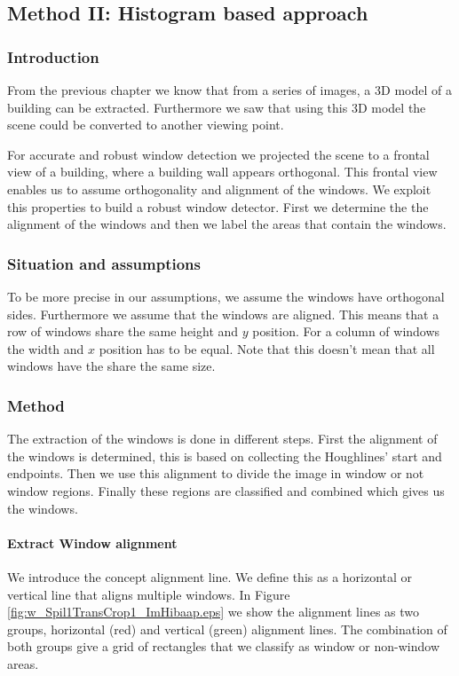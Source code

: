 

\subsection{Method II: Histogram based approach} 
\subsubsection{Introduction}
From the previous chapter we know that from a series of images, a 3D model of a
building can be extracted. Furthermore we saw that using this 3D model the
scene could be converted to another viewing point. 

For accurate and robust window detection we projected the scene to a frontal
view of a building, where a building wall appears orthogonal. This frontal
view enables us to assume orthogonality and alignment of the windows. We
exploit this properties to build a robust window detector.
First we determine the the alignment of the windows and
then we label the areas that contain the windows. 


\subsubsection{Situation and assumptions}
To be more precise in our assumptions, we assume the windows have orthogonal sides.  Furthermore we
assume that the windows are aligned. This means that a row of windows share the
same height and $y$ position. For a column of windows the width and $x$
position has to be equal.  Note that this doesn't mean that all windows have the
share the same size.

\subsubsection{Method}
The extraction of the windows is done in different steps. 
First the alignment of the windows is determined, this is based on collecting
the Houghlines' start and endpoints. Then we use this alignment to divide the
image in window or not window regions.  Finally these regions are classified
and combined which gives us the windows.


\paragraph{Extract Window alignment}
We introduce the concept alignment line. We define this as a horizontal or
vertical line that aligns multiple windows. In Figure
\ref{fig:w_Spil1TransCrop1_ImHibaap.eps}
we show the alignment lines as two groups, horizontal (red) and
vertical (green) alignment lines.  The combination of both groups give a grid of
rectangles that we classify as window or non-window areas.\\

